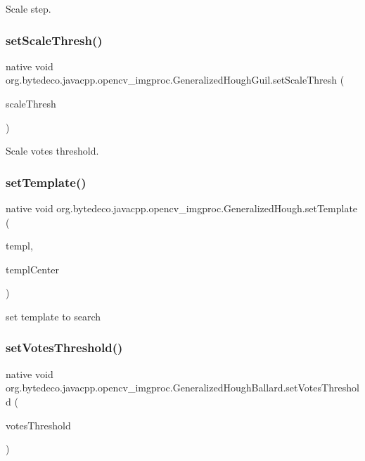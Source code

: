 Scale step. \mbox{\label{group__imgproc_ga09e4c27dd4351588315bc5b3fe754a7f}} 
\subsubsection{\texorpdfstring{set\+Scale\+Thresh()}{setScaleThresh()}}
{\footnotesize\ttfamily native void org.\+bytedeco.\+javacpp.\+opencv\+\_\+imgproc.\+Generalized\+Hough\+Guil.\+set\+Scale\+Thresh (\begin{DoxyParamCaption}\item[{int}]{scale\+Thresh }\end{DoxyParamCaption})}

Scale votes threshold. \mbox{\label{group__imgproc_ga16cb031da52c3fe55c8196bca11a72f3}} 
\subsubsection{\texorpdfstring{set\+Template()}{setTemplate()}}
{\footnotesize\ttfamily native void org.\+bytedeco.\+javacpp.\+opencv\+\_\+imgproc.\+Generalized\+Hough.\+set\+Template (\begin{DoxyParamCaption}\item[{@By\+Val Mat}]{templ,  }\item[{@By\+Val(null\+Value=\char`\"{}cv\+::\+Point(-\/1, -\/1)\char`\"{}) Point}]{templ\+Center }\end{DoxyParamCaption})}

set template to search \mbox{\label{group__imgproc_ga25a1e73a7d5ff7fe78971cb34fd6706c}} 
\subsubsection{\texorpdfstring{set\+Votes\+Threshold()}{setVotesThreshold()}}
{\footnotesize\ttfamily native void org.\+bytedeco.\+javacpp.\+opencv\+\_\+imgproc.\+Generalized\+Hough\+Ballard.\+set\+Votes\+Threshold (\begin{DoxyParamCaption}\item[{int}]{votes\+Threshold }\end{DoxyParamCaption})}


